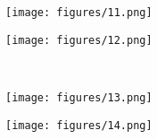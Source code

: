\documentclass{rsreport}
\begin{document}
\begin{enumerate}
        \begin{figure}[H]
            \begin{minipage}[b]{0.48\textwidth}
                \texttt{[image: figures/11.png]}
            \end{minipage}
            \begin{minipage}[b]{0.48\textwidth}
                \texttt{[image: figures/12.png]}
            \end{minipage}
            \\
            \begin{minipage}[b]{0.48\textwidth}
                \texttt{[image: figures/13.png]}
            \end{minipage}
            \begin{minipage}[b]{0.48\textwidth}
                \texttt{[image: figures/14.png]}
            \end{minipage}
        \end{figure}
    \end{enumerate}
\end{document}

